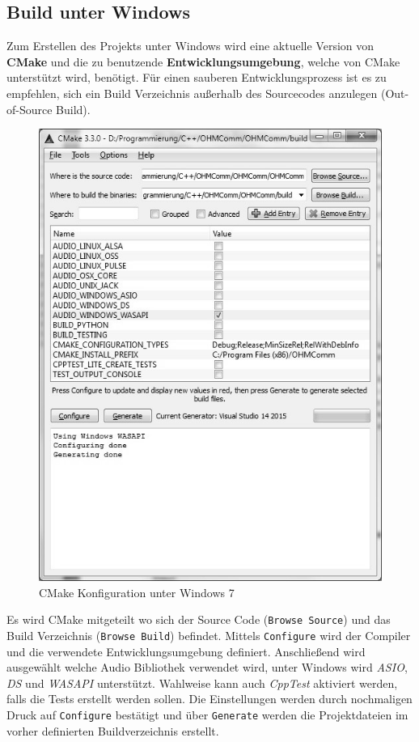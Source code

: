 \subsection{Build unter Windows}
Zum Erstellen des Projekts unter Windows wird eine aktuelle Version von \textbf{CMake} und die zu benutzende \textbf{Entwicklungsumgebung}, welche von CMake unterstützt wird, benötigt.
Für einen sauberen Entwicklungsprozess ist es zu empfehlen, sich ein Build Verzeichnis außerhalb des Sourcecodes anzulegen (Out-of-Source Build).

\begin{figure}[htp]
\centering
\includegraphics[width=.80\textwidth]{images/CMake}
\caption{CMake Konfiguration unter Windows 7}
\label{Fig:CMake}
\end{figure}

Es wird CMake mitgeteilt wo sich der Source Code (\texttt{Browse Source}) und das Build Verzeichnis (\texttt{Browse Build}) befindet.
Mittels \texttt{Configure} wird der Compiler und die verwendete Entwicklungsumgebung definiert.
Anschließend wird ausgewählt welche Audio Bibliothek verwendet wird, unter Windows wird \textit{ASIO}, \textit{DS} und \textit{WASAPI} unterstützt. Wahlweise kann auch \textit{CppTest} aktiviert werden, falls die Tests erstellt werden sollen.
Die Einstellungen werden durch nochmaligen Druck auf \texttt{Configure} bestätigt und über \texttt{Generate} werden die Projektdateien im vorher definierten Buildverzeichnis erstellt.

